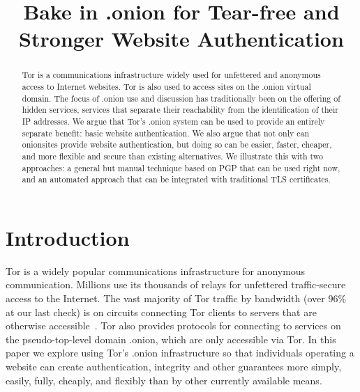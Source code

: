 \documentclass[10pt, conference, compsocconf]{styles/IEEEtran}
\title{Bake in .onion for Tear-free and Stronger Website Authentication}
\author{
\IEEEauthorblockN{Paul Syverson}
\IEEEauthorblockA{U.S. Naval Research Laboratory\\
paul.syverson@nrl.navy.mil}
\and
\IEEEauthorblockN{Griffin Boyce}
\IEEEauthorblockA{Berkman Center for Internet and Society at Harvard University\\
griffin@cryptolab.net}
}
\begin{document}
\maketitle

\begin{abstract}
  Tor is a communications infrastructure widely used for unfettered
  and anonymous access to Internet websites. Tor is also used to
  access sites on the .onion virtual domain.  The focus of .onion use
  and discussion has traditionally been on the offering of hidden
  services, services that separate their reachability from the
  identification of their IP addresses. We argue that Tor's .onion
  system can be used to provide an entirely separate benefit: basic
  website authentication. We also argue that not only can onionsites
  provide website authentication, but doing so can be easier, faster,
  cheaper, and more flexible and secure than existing alternatives.
  We illustrate this with two approaches: a general but manual
  technique based on PGP that can be used right now, and an automated
  approach that can be integrated with traditional TLS certificates.
\end{abstract}

% 
% 
% 
% 
% 
% 
% 
% 
% 
% 
% 

\section{Introduction}
Tor is a widely popular communications infrastructure for anonymous
communication. Millions use its thousands of relays for unfettered
traffic-secure access to the Internet. The vast majority of Tor
traffic by bandwidth (over 96\% at our last check) is on circuits
connecting Tor clients to servers that are otherwise
accessible~\cite{hs-stats-report-2015}. Tor
also provides protocols for connecting to services on the
pseudo-top-level domain .onion, which are only accessible via Tor.
In this paper we explore using Tor's .onion infrastructure so that
individuals operating a website can create authentication, integrity
and other guarantees more simply, easily, fully, cheaply, and flexibly
than by other currently available means.
\end{document}

